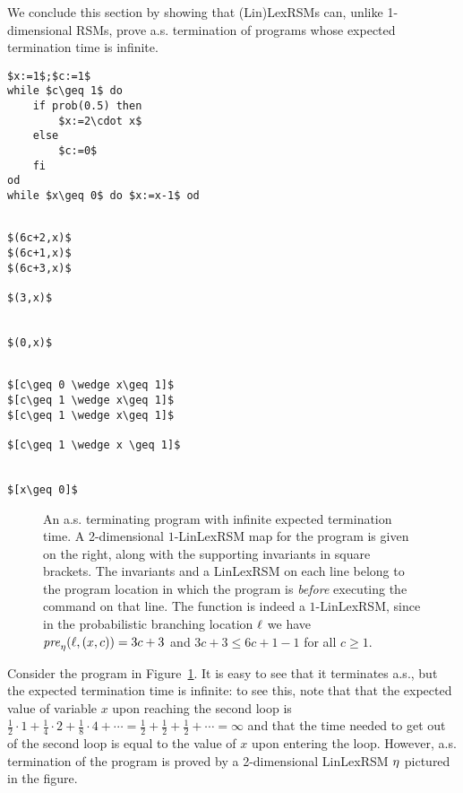 We conclude this section by showing that (Lin)LexRSMs can, unlike 1-dimensional 
RSMs, prove a.s. 
termination of programs whose expected termination time is infinite.
\lstset{language=affprob}
\lstset{tabsize=2,escapechar=\&}
\newsavebox{\infas}
\begin{lrbox}{\infas}
	\begin{lstlisting}[mathescape]
$x:=1$;$c:=1$ 
while $c\geq 1$ do				
	if prob(0.5) then			
		$x:=2\cdot x$			
	else						
		$c:=0$					
	fi							
od								
while $x\geq 0$ do $x:=x-1$ od	
	\end{lstlisting}
\end{lrbox}
\newsavebox{\infast}
\begin{lrbox}{\infast}
	\begin{lstlisting}[mathescape]

$(6c+2,x)$
$(6c+1,x)$
$(6c+3,x)$

$(3,x)$


$(0,x)$	
	\end{lstlisting}
\end{lrbox}
\newsavebox{\infastinv}
\begin{lrbox}{\infastinv}
	\begin{lstlisting}[mathescape]

$[c\geq 0 \wedge x\geq 1]$
$[c\geq 1 \wedge x\geq 1]$
$[c\geq 1 \wedge x\geq 1]$

$[c\geq 1 \wedge x \geq 1]$


$[x\geq 0]$	
	\end{lstlisting}
\end{lrbox}
\begin{figure}[t]
	\centering
	\usebox{\infas}
	\hspace{0.1cm}
	\usebox{\infast}
	\hspace{0.1cm}
	\usebox{\infastinv}
\caption{An a.s. terminating program with infinite expected termination time. A 
2-dimensional $1$-LinLexRSM map for the program is given on the right, along 
with the 
supporting invariants in square brackets. The invariants and a LinLexRSM on 
each 
line belong to the program location in which the program is \emph{before} 
executing the command on that line. The function is indeed a $1$-LinLexRSM, 
since in the probabilistic branching location $\ell$ we have 
$\mathit{pre}_{\eta}(\ell,(x,c))=3c+3$ and $3c+3\leq 6c+1-1$ for all $c\geq 1$.} 
\label{fig:inftime}
\end{figure}

\begin{example}
\label{ex:infinite-time}
Consider the program in Figure~\ref{fig:inftime}. It is easy to see that it 
terminates a.s., but the expected termination time is infinite: to see this, 
note that that the expected value of variable $x$ upon reaching the second loop 
is $\frac{1}{2}\cdot 1 + \frac{1}{4}\cdot 2 + \frac{1}{8}\cdot 4 + \cdots = 
\frac{1}{2}+\frac{1}{2}+\frac{1}{2}+\cdots=\infty$ and that the time needed to 
get out of the second loop is equal to the value of $x$ upon entering the loop. 
However, a.s. termination of the program is proved by a 2-dimensional LinLexRSM 
$\eta$ pictured in the figure.
\end{example}



